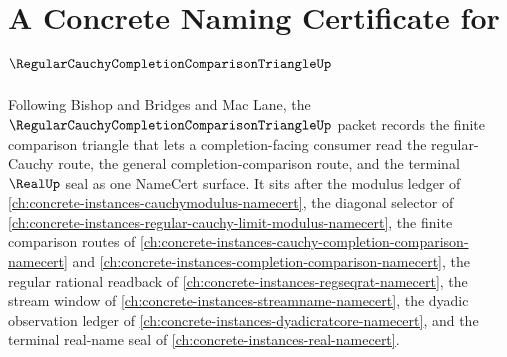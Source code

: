 \chapter{A Concrete Naming Certificate for $\RegularCauchyCompletionComparisonTriangleUp$}
\label{ch:concrete-instances-regular-cauchy-completion-comparison-triangle-namecert}

Following Bishop and Bridges and Mac Lane, the $\RegularCauchyCompletionComparisonTriangleUp$ packet records the finite comparison triangle that lets a completion-facing consumer read the regular-Cauchy route, the general completion-comparison route, and the terminal $\RealUp$ seal as one NameCert surface. It sits after the modulus ledger of \autoref{ch:concrete-instances-cauchymodulus-namecert}, the diagonal selector of \autoref{ch:concrete-instances-regular-cauchy-limit-modulus-namecert}, the finite comparison routes of \autoref{ch:concrete-instances-cauchy-completion-comparison-namecert} and \autoref{ch:concrete-instances-completion-comparison-namecert}, the regular rational readback of \autoref{ch:concrete-instances-regseqrat-namecert}, the stream window of \autoref{ch:concrete-instances-streamname-namecert}, the dyadic observation ledger of \autoref{ch:concrete-instances-dyadicratcore-namecert}, and the terminal real-name seal of \autoref{ch:concrete-instances-real-namecert}.

